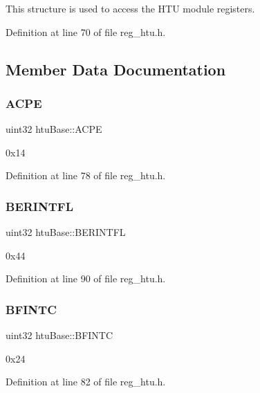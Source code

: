 This structure is used to access the H\+TU module registers. 

Definition at line 70 of file reg\+\_\+htu.\+h.



\subsection{Member Data Documentation}
\mbox{\label{structhtuBase_a723deeb1537ff4e08633bc6f24aab215}} 
\subsubsection{\texorpdfstring{A\+C\+PE}{ACPE}}
{\footnotesize\ttfamily uint32 htu\+Base\+::\+A\+C\+PE}

0x14 

Definition at line 78 of file reg\+\_\+htu.\+h.

\mbox{\label{structhtuBase_a86a8cbca34685d6ce701e03a022cc08b}} 
\subsubsection{\texorpdfstring{B\+E\+R\+I\+N\+T\+FL}{BERINTFL}}
{\footnotesize\ttfamily uint32 htu\+Base\+::\+B\+E\+R\+I\+N\+T\+FL}

0x44 

Definition at line 90 of file reg\+\_\+htu.\+h.

\mbox{\label{structhtuBase_adaae739662971a8b2263a4452cad2fc4}} 
\subsubsection{\texorpdfstring{B\+F\+I\+N\+TC}{BFINTC}}
{\footnotesize\ttfamily uint32 htu\+Base\+::\+B\+F\+I\+N\+TC}

0x24 

Definition at line 82 of file reg\+\_\+htu.\+h.

\mbox{\label{structhtuBase_ab60d557ca3d044a70d20a60a44dc008c}} 
